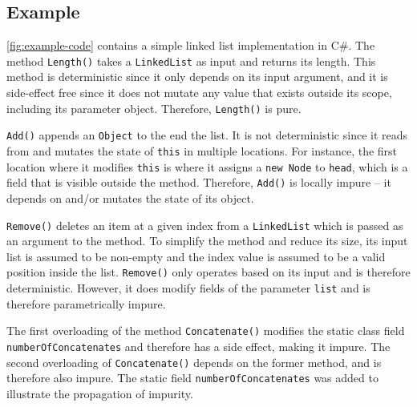 \documentclass[a4paper,12pt]{article}
\begin{document}
\subsection{Example} \label{ssub:example}

\autoref{fig:example-code} contains a simple linked list implementation in C\#. The method \texttt{Length()} takes a \texttt{LinkedList} as input and returns its length. This method is deterministic since it only depends on its input argument, and it is side-effect free since it does not mutate any value that exists outside its scope, including its parameter object. Therefore, \texttt{Length()} is pure.

\texttt{Add()} appends an \texttt{Object} to the end the list. It is not deterministic since it reads from and mutates the state of \texttt{this} in multiple locations. For instance, the first location where it modifies \texttt{this} is where it assigns a \texttt{new Node} to \texttt{head}, which is a field that is visible outside the method. Therefore, \texttt{Add()} is locally impure -- it depends on and/or mutates the state of its object.

\texttt{Remove()} deletes an item at a given index from a \texttt{LinkedList} which is passed as an argument to the method. To simplify the method and reduce its size, its input list is assumed to be non-empty and the index value is assumed to be a valid position inside the list. \texttt{Remove()} only operates based on its input and is therefore deterministic. However, it does modify fields of the parameter \texttt{list} and is therefore parametrically impure.

The first overloading of the method \texttt{Concatenate()} modifies the static class field \texttt{numberOfConcatenates} and therefore has a side effect, making it impure. The second overloading of \texttt{Concatenate()} depends on the former method, and is therefore also impure. The static field \texttt{numberOfConcatenates} was added to illustrate the propagation of impurity.
\end{document}
